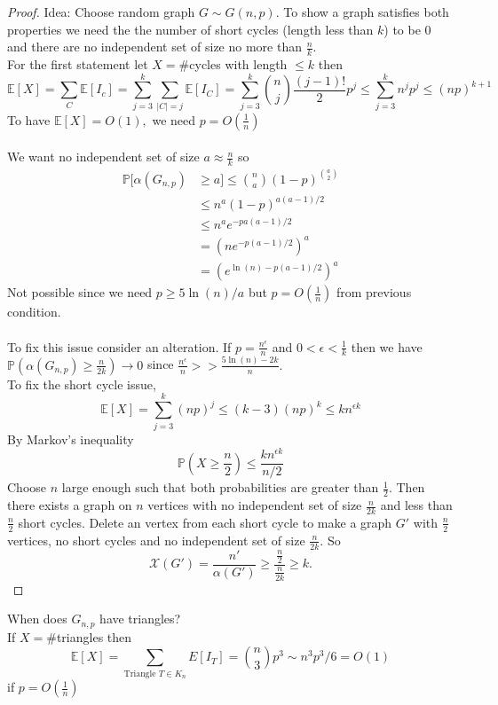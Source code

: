 \documentclass[a4paper]{article}
\begin{document}
\begin{proof}
    Idea: Choose random graph $G\sim G(n,p).$ To show a graph satisfies both properties we need the the number of short cycles (length less than $k$) to be 0 and there are no independent set of size no more than $\frac{n}{k}.$ \\
    For the first statement let $X=\#$cycles with length $\leq k$ then $$\mathbb{E}[X]=\sum_C\mathbb{E}[I_c]=\sum_{j=3}^{k}\sum_{|C|=j}\mathbb{E}[I_C]=\sum_{j=3}^k {n \choose j}\frac{(j-1)!}{2}p^j\leq \sum_{j=3}^kn^jp^j\leq (np)^{k+1}$$
    To have $\mathbb{E}[X]=O(1),$ we need $p=O\left (\frac{1}{n}\right )$ \\\\
    We want no independent set of size $a\approx \frac{n}{k}$ so
    \begin{align*}
        \mathbb{P}[\alpha(G_{n,p})&\geq a]\leq {n \choose a} (1-p)^{a \choose 2}\\
        &\leq n^a(1-p)^{a(a-1)/2}\\
        &\leq n^ae^{-pa(a-1)/2}\\
        &=\left (ne^{-p(a-1)/2} \right )^a\\
        &=\left (e^{\ln(n)-p(a-1)/2} \right )^a 
    \end{align*}
    Not possible since we need $p\geq 5\ln(n)/a$ but $p=O\left (\frac{1}{n} \right )$ from previous condition.\\\\
    To fix this issue consider an alteration.
    If $p=\frac{n^\epsilon}{n}$ and $0<\epsilon<\frac{1}{k}$ then we have $\mathbb{P}(\alpha(G_{n,p})\geq \frac{n}{2k})\to 0$ since $\frac{n^\epsilon}{n}>>\frac{5\ln(n)-2k}{n}.$\\
    To fix the short cycle issue,$$\mathbb{E}[X]=\sum_{j=3}^{k}(np)^j\leq (k-3)(np)^k\leq kn^{\epsilon k}$$
    By Markov's inequality $$\mathbb{P}\left (X\geq \frac{n}{2}\right )\leq \frac{kn^{\epsilon k}}{n/2}$$
    Choose $n$ large enough such that both probabilities are greater than $\frac{1}{2}.$ Then there exists a graph on $n$ vertices with no independent set of size $\frac{n}{2k}$ and less than $\frac{n}{2}$ short cycles. Delete an vertex from each short cycle to make a graph $G'$ with $\frac{n}{2}$ vertices, no short cycles and no independent set of size $\frac{n}{2k}.$ So $$\mathcal{X}(G')=\frac{n'}{\alpha(G')}\geq \frac{\frac{n}{2}}{\frac{n}{2k}}\geq k.$$
\end{proof}
\noindent When does $G_{n,p}$ have triangles? \\
If $X=\#$triangles then $$\mathbb{E}[X]=\sum_{\text{Triangle }T\in K_n}E[I_T]={n \choose 3}p^3\sim n^3p^3/6=O(1)$$ if $p=O \left ( \frac{1}{n} \right )$\\
\end{document}
